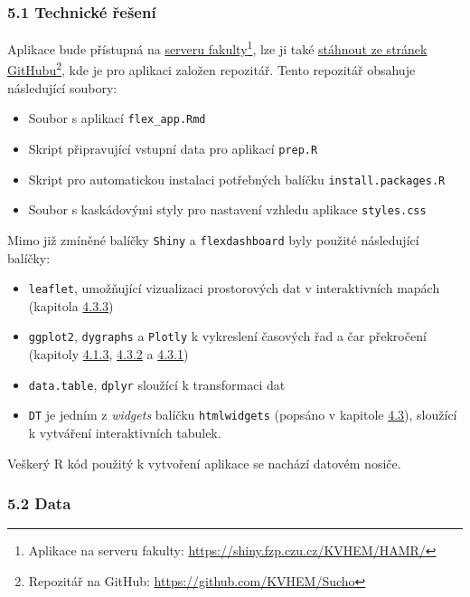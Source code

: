 \documentclass[12pt,]{article}
\providecommand{\tightlist}{%
  \setlength{\itemsep}{0pt}\setlength{\parskip}{0pt}}
\let\rmarkdownfootnote\footnote%
\def\footnote{\protect\rmarkdownfootnote}
\begin{document}
\hypertarget{techres}{\subsubsection{5.1 Technické
řešení}\label{techres}}

\qquad Aplikace bude přístupná na
\href{https://shiny.fzp.czu.cz/KVHEM/HAMR/}{serveru fakulty}\footnote{Aplikace
  na serveru fakulty: \url{https://shiny.fzp.czu.cz/KVHEM/HAMR/}}, lze
ji také \href{https://github.com/KVHEM/Sucho}{stáhnout ze stránek
GitHubu}\footnote{Repozitář na GitHub:
  \url{https://github.com/KVHEM/Sucho}}, kde je pro aplikaci založen
repozitář. Tento repozitář obsahuje následující soubory:

\begin{itemize}
\tightlist
\item
  Soubor s aplikací \texttt{flex\_app.Rmd}
\item
  Skript připravující vstupní data pro aplikací \texttt{prep.R}
\item
  Skript pro automatickou instalaci potřebných balíčku
  \texttt{install.packages.R}
\item
  Soubor s kaskádovými styly pro nastavení vzhledu aplikace
  \texttt{styles.css}
\end{itemize}

Mimo již zmíněné balíčky \texttt{Shiny} a \texttt{flexdashboard} byly
použité následující balíčky:

\begin{itemize}
\tightlist
\item
  \texttt{leaflet}, umožňující vizualizaci prostorových dat v
  interaktivních mapách (kapitola \protect\hyperlink{leaflet}{4.3.3})
\item
  \texttt{ggplot2}, \texttt{dygraphs} a \texttt{Plotly} k vykreslení
  časových řad a čar překročení (kapitoly
  \protect\hyperlink{ggplot}{4.1.3}, \protect\hyperlink{dygraphs}{4.3.2}
  a \protect\hyperlink{plotly}{4.3.1})
\item
  \texttt{data.table}, \texttt{dplyr} sloužící k transformaci dat
\item
  \texttt{DT} je jedním z \emph{widgets} balíčku \texttt{htmlwidgets}
  (popsáno v kapitole \protect\hyperlink{htmlwidgets}{4.3}), sloužící k
  vytváření interaktivních tabulek.
\end{itemize}

Veškerý R kód použitý k vytvoření aplikace se nachází datovém nosiče.

\hypertarget{data}{\subsubsection{5.2 Data}\label{data}}
\end{document}
